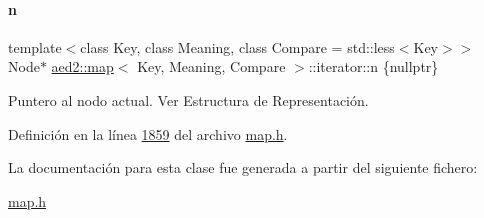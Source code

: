 \paragraph{\texorpdfstring{n}{n}}
{\footnotesize\ttfamily template$<$class Key, class Meaning, class Compare = std\+::less$<$\+Key$>$$>$ \\
Node$\ast$ \hyperlink{classaed2_1_1map}{aed2\+::map}$<$ Key, Meaning, Compare $>$\+::iterator\+::n \{nullptr\}\hspace{0.3cm}{\ttfamily [private]}}



Puntero al nodo actual. Ver Estructura de Representación. 



Definición en la línea \hyperlink{map_8h_source_l01859}{1859} del archivo \hyperlink{map_8h_source}{map.\+h}.



La documentación para esta clase fue generada a partir del siguiente fichero\+:\begin{DoxyCompactItemize}
\item 
\hyperlink{map_8h}{map.\+h}\end{DoxyCompactItemize}
